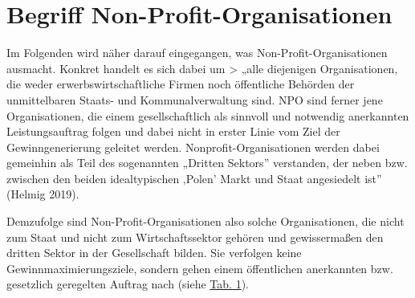 \documentclass[
  letterpaper,
]{book}
\begin{document}
\section{Begriff Non-Profit-Organisationen}\label{begriffnpo}

Im Folgenden wird näher darauf eingegangen, was
Non-Profit-Organisationen ausmacht. Konkret handelt es sich dabei um
\textgreater{} „alle diejenigen Organisationen, die weder
erwerbswirtschaftliche Firmen noch öffentliche Behörden der
unmittelbaren Staats- und Kommunalverwaltung sind. NPO sind ferner jene
Organisationen, die einem gesellschaftlich als sinnvoll und notwendig
anerkannten Leistungsauftrag folgen und dabei nicht in erster Linie vom
Ziel der Gewinngenerierung geleitet werden. Nonprofit-Organisationen
werden dabei gemeinhin als Teil des sogenannten „Dritten Sektors''
verstanden, der neben bzw. zwischen den beiden idealtypischen ‚Polen'
Markt und Staat angesiedelt ist'' (Helmig 2019).

Demzufolge sind Non-Profit-Organisationen also solche Organisationen,
die nicht zum Staat und nicht zum Wirtschaftssektor gehören und
gewissermaßen den dritten Sektor in der Gesellschaft bilden. Sie
verfolgen keine Gewinnmaximierungsziele, sondern gehen einem
öffentlichen anerkannten bzw. gesetzlich geregelten Auftrag nach (siehe
\hyperref[table1]{Tab. 1}).
\end{document}
